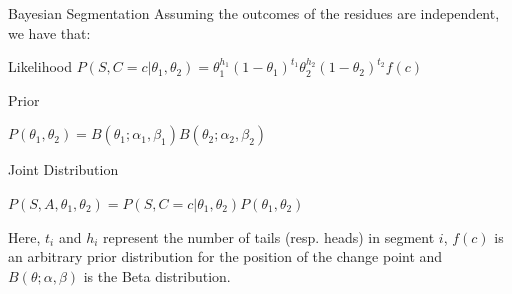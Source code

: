 \documentclass{beamer}
\begin{document}
    \begin{frame}{Bayesian Segmentation}
        Assuming the outcomes of the residues are independent, we have that:  
            \begin{block}{Likelihood}
            $P(S, C = c|\theta_1,\theta_2) = \theta_1^{h_1}(1-\theta_1)^{t_1}\theta_2^{h_2}(1-\theta_2)^{t_2}f(c)$
            \end{block}
        \begin{block}{Prior}
        
            $P(\theta_1,\theta_2) = B(\theta_1;\alpha_1,\beta_1)B(\theta_2;\alpha_2,\beta_2)$
        \end{block}
        \begin{block}{Joint Distribution}
        
            $P(S,A,\theta_1,\theta_2)=P(S, C = c|\theta_1,\theta_2)P(\theta_1,\theta_2)$
        \end{block}
        
        Here, $t_i$ and $h_i$ represent the number of tails (resp. heads) in segment $i$, $f(c)$ is an arbitrary prior distribution for the position of the change point and $B(\theta;\alpha,\beta)$ is the Beta distribution.
    \end{frame}
    
\end{document}
